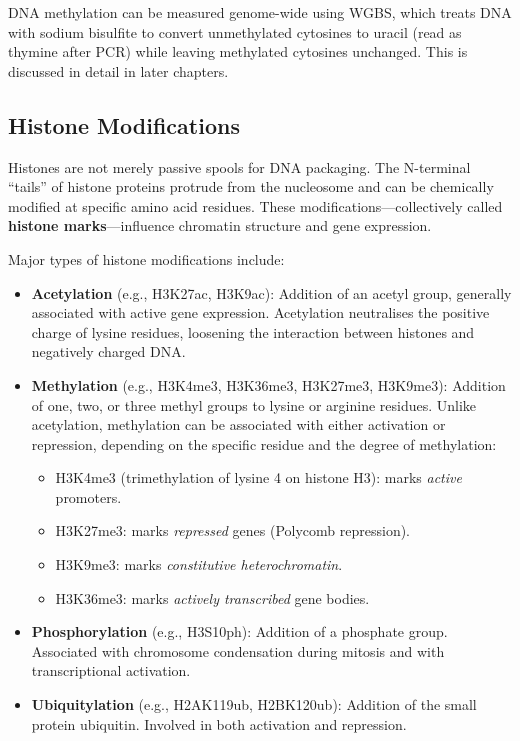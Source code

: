 DNA methylation can be measured genome-wide using \acrshort{WGBS}, which treats DNA with sodium bisulfite to convert unmethylated cytosines to uracil (read as thymine after \acrshort{PCR}) while leaving methylated cytosines unchanged. This is discussed in detail in later chapters.

\subsection{Histone Modifications}
\label{subsec:molbio:histone-mods}

Histones are not merely passive spools for DNA packaging. The N-terminal ``tails'' of histone proteins protrude from the nucleosome and can be chemically modified at specific amino acid residues. These modifications---collectively called \textbf{histone marks}---influence chromatin structure and gene expression.

Major types of histone modifications include:

\begin{itemize}[itemsep=2pt]
  \item \textbf{Acetylation} (e.g., H3K27ac, H3K9ac): Addition of an acetyl group, generally associated with active gene expression. Acetylation neutralises the positive charge of lysine residues, loosening the interaction between histones and negatively charged DNA.
  \item \textbf{Methylation} (e.g., H3K4me3, H3K36me3, H3K27me3, H3K9me3): Addition of one, two, or three methyl groups to lysine or arginine residues. Unlike acetylation, methylation can be associated with either activation or repression, depending on the specific residue and the degree of methylation:
  \begin{itemize}
    \item H3K4me3 (trimethylation of lysine 4 on histone H3): marks \textit{active} promoters.
    \item H3K27me3: marks \textit{repressed} genes (Polycomb repression).
    \item H3K9me3: marks \textit{constitutive heterochromatin}.
    \item H3K36me3: marks \textit{actively transcribed} gene bodies.
  \end{itemize}
  \item \textbf{Phosphorylation} (e.g., H3S10ph): Addition of a phosphate group. Associated with chromosome condensation during mitosis and with transcriptional activation.
  \item \textbf{Ubiquitylation} (e.g., H2AK119ub, H2BK120ub): Addition of the small protein ubiquitin. Involved in both activation and repression.
\end{itemize}


